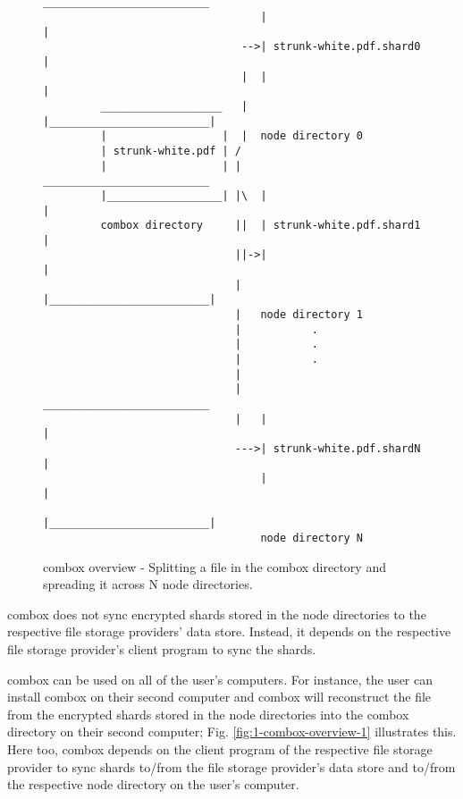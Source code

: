 \begin{figure}[h]
\begin{verbatim}

                                  __________________________
                                  |                         |
                               -->| strunk-white.pdf.shard0 |
                               |  |                         |
         ___________________   |  |_________________________|
         |                  |  |  node directory 0
         | strunk-white.pdf | /
         |                  | |   __________________________
         |__________________| |\  |                         |
         combox directory     ||  | strunk-white.pdf.shard1 |
                              ||->|                         |
                              |   |_________________________|
                              |   node directory 1
                              |           .
                              |           .
                              |           .
                              |
                              |   __________________________
                              |   |                         |
                              --->| strunk-white.pdf.shardN |
                                  |                         |
                                  |_________________________|
                                  node directory N
\end{verbatim}
  \caption{combox overview - Splitting a file in the combox directory
    and spreading it across N node directories.}
  \label{fig:1-combox-overview-0}
\end{figure}

combox does not sync encrypted shards stored in the node directories
to the respective file storage providers' data store. Instead, it
depends on the respective file storage provider's client program to
sync the shards.

combox can be used on all of the user's computers. For instance, the
user can install combox on their second computer and combox will
reconstruct the file from the encrypted shards stored in the node
directories into the combox directory on their second computer;
Fig. \ref{fig:1-combox-overview-1} illustrates this. Here too, combox
depends on the client program of the respective file storage provider
to sync shards to/from the file storage provider's data store and
to/from the respective node directory on the user's computer.

